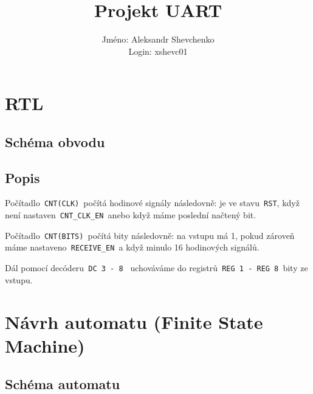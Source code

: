 \documentclass[12pt, a4paper]{article}
\title{Projekt UART}
\author{Jméno: Aleksandr Shevchenko \\ Login: xshevc01 }
\date{}
\begin{document}
\maketitle
\section{RTL}
\subsection{Schéma obvodu}
\begin{centering}
\end{centering}
\subsection{Popis}

Počítadlo\texttt{ CNT(CLK) }počítá hodinové signály následovně: je ve stavu\texttt{ RST}, když není nastaven\texttt{ CNT\_CLK\_EN }anebo když máme poslední načtený bit.
    
Počítadlo\texttt{ CNT(BITS) }počítá bity následovně: na vstupu má 1, pokud zároveň máme nastaveno\texttt{ RECEIVE\_EN }a když minulo 16 hodinových signálů.

Dál pomocí decóderu\texttt{ DC 3\,-\,8 } uchováváme do registrů\texttt{ REG 1\,-\,REG 8 }bity ze vstupu.

\newpage
\section{Návrh automatu (Finite State Machine)}
\subsection{Schéma automatu}
\begin{centering}
\end{centering}
\end{document}

